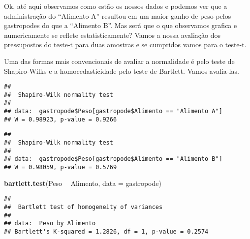 \documentclass[14pt,titlepage, oneside, openany, a4paper]{book}
\newenvironment{Shaded}{\begin{snugshade}}{\end{snugshade}}
\newcommand{\DataTypeTok}[1]{\textcolor[rgb]{0.13,0.29,0.53}{#1}}
\newcommand{\KeywordTok}[1]{\textcolor[rgb]{0.13,0.29,0.53}{\textbf{#1}}}
\newcommand{\NormalTok}[1]{#1}
\newcommand{\OperatorTok}[1]{\textcolor[rgb]{0.81,0.36,0.00}{\textbf{#1}}}
\newcommand{\StringTok}[1]{\textcolor[rgb]{0.31,0.60,0.02}{#1}}
\begin{document}
Ok, até aqui observamos como estão os nossos dados e podemos ver que a administração do ``Alimento A'' resultou em um maior ganho de peso pelos gastropodes do que a ``Alimento B''. Mas será que o que observamos grafica e numericamente se reflete estatisticamente? Vamos a nossa avaliação dos pressupostos do teste-t para duas amostras e se cumpridos vamos para o teste-t.

Uma das formas mais convencionais de avaliar a normalidade é pelo teste de Shapiro-Wilks e a homocedasticidade pelo teste de Bartlett. Vamos avalia-las.

\begin{Shaded}
\end{Shaded}

\begin{verbatim}
## 
##  Shapiro-Wilk normality test
## 
## data:  gastropode$Peso[gastropode$Alimento == "Alimento A"]
## W = 0.98923, p-value = 0.9266
\end{verbatim}

\begin{Shaded}
\end{Shaded}

\begin{verbatim}
## 
##  Shapiro-Wilk normality test
## 
## data:  gastropode$Peso[gastropode$Alimento == "Alimento B"]
## W = 0.98059, p-value = 0.5769
\end{verbatim}

\begin{Shaded}
\begin{Highlighting}[]
\KeywordTok{bartlett.test}\NormalTok{(Peso }\OperatorTok{~}\StringTok{ }\NormalTok{Alimento, }\DataTypeTok{data =}\NormalTok{ gastropode)}
\end{Highlighting}
\end{Shaded}

\begin{verbatim}
## 
##  Bartlett test of homogeneity of variances
## 
## data:  Peso by Alimento
## Bartlett's K-squared = 1.2826, df = 1, p-value = 0.2574
\end{verbatim}
\end{document}
